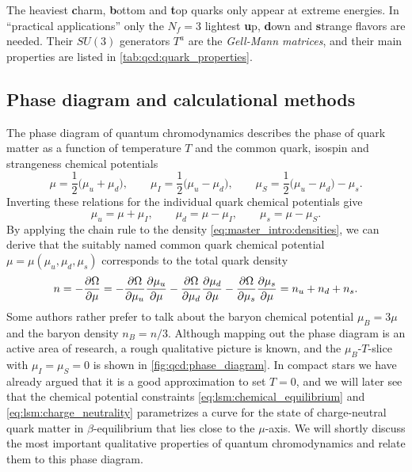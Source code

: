 The heaviest \textbf{c}harm, \textbf{b}ottom and \textbf{t}op quarks only appear at extreme energies.
In ``practical applications'' only the $N_f=3$ lightest \textbf{u}p, \textbf{d}own and \textbf{s}trange flavors are needed.
Their $SU(3)$ generators $T^a$ are the \emph{Gell-Mann matrices},
and their main properties are listed in \cref{tab:qcd:quark_properties}.

\subsection*{Phase diagram and calculational methods}

The phase diagram of quantum chromodynamics describes the phase of quark matter
as a function of temperature $T$ and the common quark, isospin and strangeness chemical potentials
\begin{equation}
	\mu   = \frac12 \big( \mu_u + \mu_d \big), \qquad
	\mu_I = \frac12 \big( \mu_u - \mu_d \big), \qquad
	\mu_S = \frac12 \big( \mu_u - \mu_d \big) - \mu_s.
\label{eq:master_intro:chemical_potentials_transformed}
\end{equation}
Inverting these relations for the individual quark chemical potentials give
\begin{equation}
	\mu_u = \mu + \mu_I, \qquad
	\mu_d = \mu - \mu_I, \qquad
	\mu_s = \mu - \mu_S .
\label{eq:master_intro:chemical_potentials_particles}
\end{equation}
By applying the chain rule to the density \eqref{eq:master_intro:densities},
we can derive that the suitably named common quark chemical potential $\mu=\mu(\mu_u,\mu_d,\mu_s)$ corresponds to the total quark density
\begin{equation}
	n = -\pdv{\Omega}{\mu} =
	-\pdv{\Omega}{\mu_u} \pdv{\mu_u}{\mu}
	-\pdv{\Omega}{\mu_d} \pdv{\mu_d}{\mu}
	-\pdv{\Omega}{\mu_s} \pdv{\mu_s}{\mu} =
	n_u + n_d + n_s.
\end{equation}
Some authors rather prefer to talk about the baryon chemical potential $\mu_B = 3 \mu$ and the baryon density $n_B = n / 3$.
Although mapping out the phase diagram is an active area of research, a rough qualitative picture is known, and the $\mu_B$-$T$-slice with $\mu_I = \mu_S = 0$ is shown in \cref{fig:qcd:phase_diagram}.
In compact stars we have already argued that it is a good approximation to set $T=0$,
and we will later see that the chemical potential constraints \eqref{eq:lsm:chemical_equilibrium} and \eqref{eq:lsm:charge_neutrality}
parametrizes a curve for the state of charge-neutral quark matter in $\beta$-equilibrium that lies close to the $\mu$-axis.
We will shortly discuss the most important qualitative properties of quantum chromodynamics and relate them to this phase diagram.

